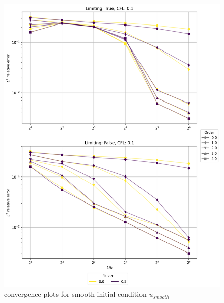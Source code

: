 \begin{figure}[p!]
	\centering
	\includegraphics[width=1.1\textwidth]{../figs/parametric/advection_1D/advection_1D_smooth_reduced.png}
	\caption{ convergence plots for smooth initial condition 
		$u_{smooth}$}
	\label{fig:adv_conv_1D}
\end{figure}



